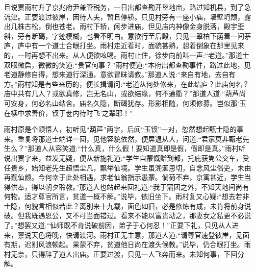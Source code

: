 \begin{parag}
    且说贾雨村升了京兆府尹兼管税务，一日出都查勘开垦地亩，路过知机县，到了急流津。正要渡过彼岸，因待人夫，暂且停轿。只见村旁有一座小庙，墙壁坍颓，露出几株古松，倒也苍老。雨村下轿，闲步进庙，但见庙内神像金身脱落，殿宇歪斜，旁有断碣，字迹模糊，也看不明白。意欲行至后殿，只见一翠柏下荫着一间茅庐，庐中有一个道士合眼打坐。雨村走近看时，面貌甚熟，想着倒象在那里见来的，一时再想不出来。从人便欲吆喝。雨村止住，徐步向前叫一声:“老道。”那道士双眼微启，微微的笑道:“贵官何事？”雨村便道:“本府出都查勘事件，路过此地，见老道静修自得，想来道行深通，意欲冒昧请教。”那道人说:“来自有地，去自有方。”雨村知是有些来历的，便长揖请问:“老道从何处修来，在此结庐？此庙何名？庙中共有几人？或欲真修，岂无名山，或欲结缘，何不通衢？”那道人道:“葫芦尚可安身，何必名山结舍。庙名久隐，断碣犹存。形影相随，何须修募。岂似那‘玉在椟中求善价，钗于奁内待时飞’之辈耶！”
\end{parag}


\begin{parag}
    雨村原是个颖悟人，初听见“葫芦”两字，后闻“玉钗”一对，忽然想起甄士隐的事来。重复将那道士端详一回，见他容貌依然，便屏退从人，问道:“君家莫非甄老先生么？”那道人从容笑道:“什么真，什么假！要知道真即是假，假即是真。”雨村听说出贾字来，益发无疑，便从新施礼道:“学生自蒙慨赠到都，托庇获隽公交车，受任贵乡，始知老先生超悟尘凡，飘举仙境。学生虽溯洄思切，自念风尘俗吏，未由再觐仙颜。今何幸于此处相遇，求老仙翁指示愚蒙。倘荷不弃，京寓甚近，学生当得供奉，得以朝夕聆教。”那道人也站起来回礼道:“我于蒲团之外，不知天地间尚有何物。适才尊官所言，贫道一概不解。”说毕，依旧坐下。雨村复又心疑:“想去若非士隐，何貌言相似若此？离别来十九载，面色如旧，必是修炼有成，未肯将前身说破。但我既遇恩公，又不可当面错过。看来不能以富贵动之，那妻女之私更不必说了。”想罢又道:“仙师既不肯说破前因，弟子于心何忍！”正要下礼，只见从人进来，禀说天色将晚，快请渡河。雨村正无主意，那道人道:“请尊官速登彼岸，见面有期，迟则风浪顿起。果蒙不弃，贫道他日尚在渡头候教。”说毕，仍合眼打坐。雨村无奈，只得辞了道人出庙。正要过渡，只见一人飞奔而来。未知何事，下回分解。
\end{parag}